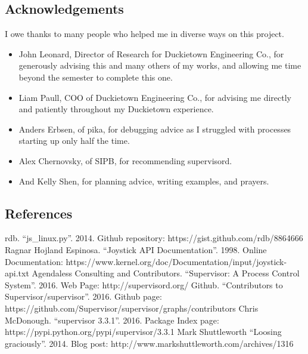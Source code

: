\documentclass[titlepage]{article}
\begin{document}
\subsection{Acknowledgements}
I owe thanks to many people who helped me in diverse ways on this project. 
\begin{itemize}
\item John Leonard, Director of Research for Duckietown Engineering Co., for generously advising this and many others of my works, and allowing me time beyond the semester to complete this one.
\item Liam Paull, COO of Duckietown Engineering Co., for advising me directly and patiently throughout my Duckietown experience. 
\item Anders Erbsen, of pika, for debugging advice as I struggled with processes starting up only half the time.
\item Alex Chernovsky, of SIPB, for recommending supervisord.
\item And Kelly Shen, for planning advice, writing examples, and prayers. 
\end{itemize}

\subsection{References}
\begin{thebibliography}{1}
 rdb. ``js\_linux.py''. 2014. Github repository: https://gist.github.com/rdb/8864666
 Ragnar Hojland Espinosa. ``Joystick API Documentation''. 1998. Online Documentation: https://www.kernel.org/doc/Documentation/input/joystick-api.txt
 Agendaless Consulting and Contributors. ``Supervisor: A Process Control System''. 2016. Web Page: http://supervisord.org/
 Github. ``Contributors to Supervisor/supervisor''. 2016. Github page: https://github.com/Supervisor/supervisor/graphs/contributors 
 Chris McDonough. ``supervisor 3.3.1''. 2016. Package Index page: https://pypi.python.org/pypi/supervisor/3.3.1
 Mark Shuttleworth ``Loosing graciously''. 2014. Blog post:  http://www.markshuttleworth.com/archives/1316
\end{thebibliography}
\end{document}
